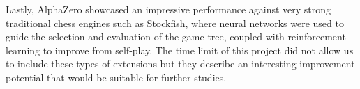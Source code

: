 \documentclass[a4paper,12pt]{article}
\begin{document}
Lastly, AlphaZero showcased an impressive performance against very strong traditional chess engines such as Stockfish, where neural networks were used to guide the selection and evaluation of the game tree, coupled with reinforcement learning to improve from self-play. The time limit of this project did not allow us to include these types of extensions but they describe an interesting improvement potential that would be suitable for further studies. 

\clearpage


\end{document}
